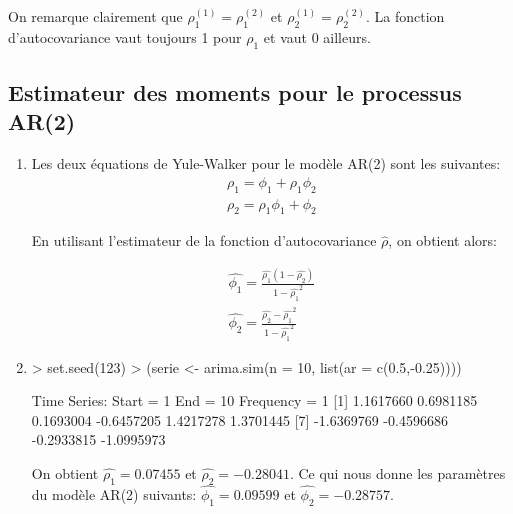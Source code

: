 \documentclass{article}
\begin{document}
On remarque clairement que $\rho_1^{(1)} = \rho_1^{(2)}$ et $\rho_2^{(1)} = \rho_2^{(2)}$. 
La fonction d'autocovariance vaut toujours 1 pour $\rho_1$ et vaut 0 ailleurs.

\clearpage
\subsection{Estimateur des moments pour le processus AR(2)}
\begin{enumerate}
\item 
Les deux équations de Yule-Walker pour le modèle AR(2) sont les suivantes:
\begin{align*}
\rho_1 = \phi_1 + \rho_1 \phi_2 \\
\rho_2 = \rho_1\phi_1 + \phi_2
\end{align*}

En utilisant l'estimateur de la fonction d'autocovariance $\hat{\rho}$, on obtient alors:

\begin{align*}
\hat{\phi_1} = \frac{\hat{\rho_1}(1-\hat{\rho_2})}{1-\hat{\rho_1}^2} \\
\hat{\phi_2} = \frac{\hat{\rho_2} - \hat{\rho_1}^2}{1-\hat{\rho_1}^2}
\end{align*}


\item

\begin{Schunk}
\begin{Sinput}
> set.seed(123)
> (serie <- arima.sim(n = 10, list(ar = c(0.5,-0.25))))
\end{Sinput}
\begin{Soutput}
Time Series:
Start = 1 
End = 10 
Frequency = 1 
 [1]  1.1617660  0.6981185  0.1693004 -0.6457205  1.4217278  1.3701445
 [7] -1.6369769 -0.4596686 -0.2933815 -1.0995973
\end{Soutput}
\end{Schunk}

On obtient $ = 0.07455$ et $ = -0.28041$. 
Ce qui nous donne les paramètres du modèle AR(2) suivants:
$ = 0.09599$ et 
$ = -0.28757$.
\end{enumerate}




\clearpage

\end{document}
